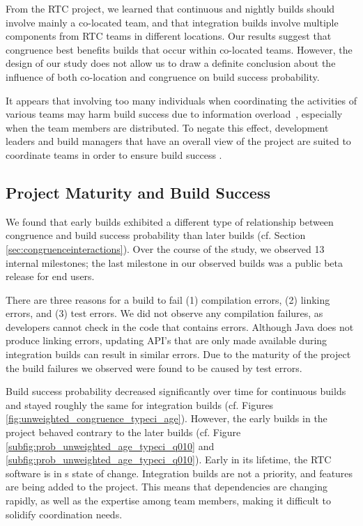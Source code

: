From the RTC project, we learned that continuous and nightly builds should involve mainly a co-located team, and that integration builds involve multiple components from RTC teams in different locations. Our results suggest that congruence best benefits builds that occur within co-located teams. However, the design of our study does not allow us to draw a definite conclusion about the influence of both co-location and congruence on build success probability.

It appears that involving too many individuals when coordinating the activities of various teams may harm build success due to information overload~\cite{damian:icgse:2007}, especially when the team members are distributed. To negate this effect, development leaders and build managers that have an overall view of the project are suited to coordinate teams in order to ensure build success \cite{hinds:cscw:2006}.


\subsection{Project Maturity and Build Success}
We found that early builds exhibited a different type of relationship between congruence and build success probability than later builds (cf. Section \ref{sec:congruenceinteractions}). Over the course of the study, we observed 13 internal milestones; the last milestone in our observed builds was a public beta release for end users.

There are three reasons for a build to fail (1) compilation errors, (2) linking errors, and (3) test errors.
We did not observe any compilation failures, as developers cannot check in the code that contains errors.
Although Java does not produce linking errors, updating API's that are only made available during integration builds can result in similar errors.
Due to the maturity of the project the build failures we observed were found to be caused by test errors.

Build success probability decreased significantly over time for continuous builds and stayed roughly the same for integration builds (cf. Figures \ref{fig:unweighted_congruence_typeci_age}).
However, the early builds in the project behaved contrary to the later builds (cf. Figure \ref{subfig:prob_unweighted_age_typeci_q010} and \ref{subfig:prob_unweighted_age_typeci_q010}). Early in its lifetime, the RTC software is in s state of change. Integration builds are not a priority, and features are being added to the project. This means that dependencies are changing rapidly, as well as the expertise among team members, making it difficult to solidify coordination needs.

